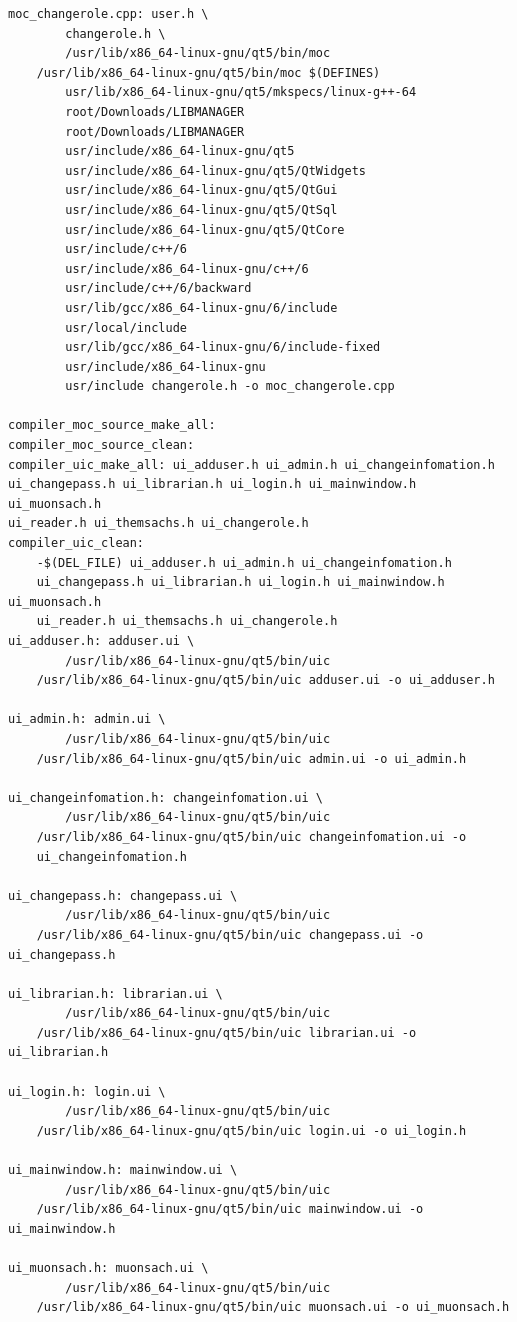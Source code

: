 \documentclass[a4paper]{article}
\begin{document}
\begin{verbatim}
moc_changerole.cpp: user.h \
		changerole.h \
		/usr/lib/x86_64-linux-gnu/qt5/bin/moc
	/usr/lib/x86_64-linux-gnu/qt5/bin/moc $(DEFINES)
		usr/lib/x86_64-linux-gnu/qt5/mkspecs/linux-g++-64
		root/Downloads/LIBMANAGER
		root/Downloads/LIBMANAGER
		usr/include/x86_64-linux-gnu/qt5
		usr/include/x86_64-linux-gnu/qt5/QtWidgets
		usr/include/x86_64-linux-gnu/qt5/QtGui
		usr/include/x86_64-linux-gnu/qt5/QtSql
		usr/include/x86_64-linux-gnu/qt5/QtCore
		usr/include/c++/6
		usr/include/x86_64-linux-gnu/c++/6
		usr/include/c++/6/backward
		usr/lib/gcc/x86_64-linux-gnu/6/include
		usr/local/include
		usr/lib/gcc/x86_64-linux-gnu/6/include-fixed
		usr/include/x86_64-linux-gnu
		usr/include changerole.h -o moc_changerole.cpp

compiler_moc_source_make_all:
compiler_moc_source_clean:
compiler_uic_make_all: ui_adduser.h ui_admin.h ui_changeinfomation.h 
ui_changepass.h ui_librarian.h ui_login.h ui_mainwindow.h ui_muonsach.h 
ui_reader.h ui_themsachs.h ui_changerole.h
compiler_uic_clean:
	-$(DEL_FILE) ui_adduser.h ui_admin.h ui_changeinfomation.h 
	ui_changepass.h ui_librarian.h ui_login.h ui_mainwindow.h ui_muonsach.h 
	ui_reader.h ui_themsachs.h ui_changerole.h
ui_adduser.h: adduser.ui \
		/usr/lib/x86_64-linux-gnu/qt5/bin/uic
	/usr/lib/x86_64-linux-gnu/qt5/bin/uic adduser.ui -o ui_adduser.h

ui_admin.h: admin.ui \
		/usr/lib/x86_64-linux-gnu/qt5/bin/uic
	/usr/lib/x86_64-linux-gnu/qt5/bin/uic admin.ui -o ui_admin.h

ui_changeinfomation.h: changeinfomation.ui \
		/usr/lib/x86_64-linux-gnu/qt5/bin/uic
	/usr/lib/x86_64-linux-gnu/qt5/bin/uic changeinfomation.ui -o 
	ui_changeinfomation.h

ui_changepass.h: changepass.ui \
		/usr/lib/x86_64-linux-gnu/qt5/bin/uic
	/usr/lib/x86_64-linux-gnu/qt5/bin/uic changepass.ui -o ui_changepass.h

ui_librarian.h: librarian.ui \
		/usr/lib/x86_64-linux-gnu/qt5/bin/uic
	/usr/lib/x86_64-linux-gnu/qt5/bin/uic librarian.ui -o ui_librarian.h

ui_login.h: login.ui \
		/usr/lib/x86_64-linux-gnu/qt5/bin/uic
	/usr/lib/x86_64-linux-gnu/qt5/bin/uic login.ui -o ui_login.h

ui_mainwindow.h: mainwindow.ui \
		/usr/lib/x86_64-linux-gnu/qt5/bin/uic
	/usr/lib/x86_64-linux-gnu/qt5/bin/uic mainwindow.ui -o ui_mainwindow.h

ui_muonsach.h: muonsach.ui \
		/usr/lib/x86_64-linux-gnu/qt5/bin/uic
	/usr/lib/x86_64-linux-gnu/qt5/bin/uic muonsach.ui -o ui_muonsach.h


\end{verbatim}
\end{document}
